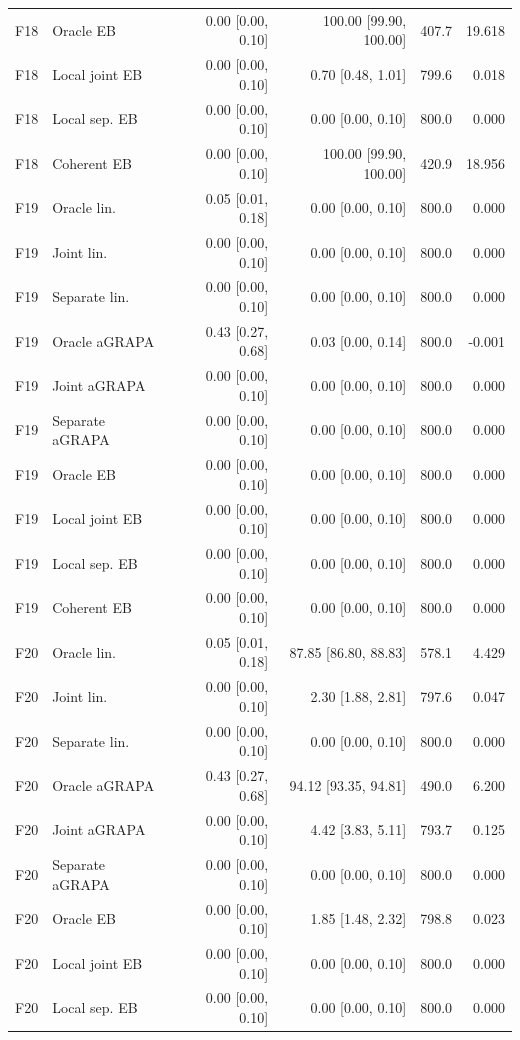 \begin{longtable}{llrrrr}
F18 & Oracle EB & 0.00 [0.00, 0.10] & 100.00 [99.90, 100.00] & 407.7 & 19.618\\
F18 & Local joint EB & 0.00 [0.00, 0.10] & 0.70 [0.48, 1.01] & 799.6 & 0.018\\
F18 & Local sep. EB & 0.00 [0.00, 0.10] & 0.00 [0.00, 0.10] & 800.0 & 0.000\\
F18 & Coherent EB & 0.00 [0.00, 0.10] & 100.00 [99.90, 100.00] & 420.9 & 18.956\\
F19 & Oracle lin. & 0.05 [0.01, 0.18] & 0.00 [0.00, 0.10] & 800.0 & 0.000\\
F19 & Joint lin. & 0.00 [0.00, 0.10] & 0.00 [0.00, 0.10] & 800.0 & 0.000\\
F19 & Separate lin. & 0.00 [0.00, 0.10] & 0.00 [0.00, 0.10] & 800.0 & 0.000\\
F19 & Oracle aGRAPA & 0.43 [0.27, 0.68] & 0.03 [0.00, 0.14] & 800.0 & -0.001\\
F19 & Joint aGRAPA & 0.00 [0.00, 0.10] & 0.00 [0.00, 0.10] & 800.0 & 0.000\\
F19 & Separate aGRAPA & 0.00 [0.00, 0.10] & 0.00 [0.00, 0.10] & 800.0 & 0.000\\
F19 & Oracle EB & 0.00 [0.00, 0.10] & 0.00 [0.00, 0.10] & 800.0 & 0.000\\
F19 & Local joint EB & 0.00 [0.00, 0.10] & 0.00 [0.00, 0.10] & 800.0 & 0.000\\
F19 & Local sep. EB & 0.00 [0.00, 0.10] & 0.00 [0.00, 0.10] & 800.0 & 0.000\\
F19 & Coherent EB & 0.00 [0.00, 0.10] & 0.00 [0.00, 0.10] & 800.0 & 0.000\\
F20 & Oracle lin. & 0.05 [0.01, 0.18] & 87.85 [86.80, 88.83] & 578.1 & 4.429\\
F20 & Joint lin. & 0.00 [0.00, 0.10] & 2.30 [1.88, 2.81] & 797.6 & 0.047\\
F20 & Separate lin. & 0.00 [0.00, 0.10] & 0.00 [0.00, 0.10] & 800.0 & 0.000\\
F20 & Oracle aGRAPA & 0.43 [0.27, 0.68] & 94.12 [93.35, 94.81] & 490.0 & 6.200\\
F20 & Joint aGRAPA & 0.00 [0.00, 0.10] & 4.42 [3.83, 5.11] & 793.7 & 0.125\\
F20 & Separate aGRAPA & 0.00 [0.00, 0.10] & 0.00 [0.00, 0.10] & 800.0 & 0.000\\
F20 & Oracle EB & 0.00 [0.00, 0.10] & 1.85 [1.48, 2.32] & 798.8 & 0.023\\
F20 & Local joint EB & 0.00 [0.00, 0.10] & 0.00 [0.00, 0.10] & 800.0 & 0.000\\
F20 & Local sep. EB & 0.00 [0.00, 0.10] & 0.00 [0.00, 0.10] & 800.0 & 0.000\\

\end{longtable}
